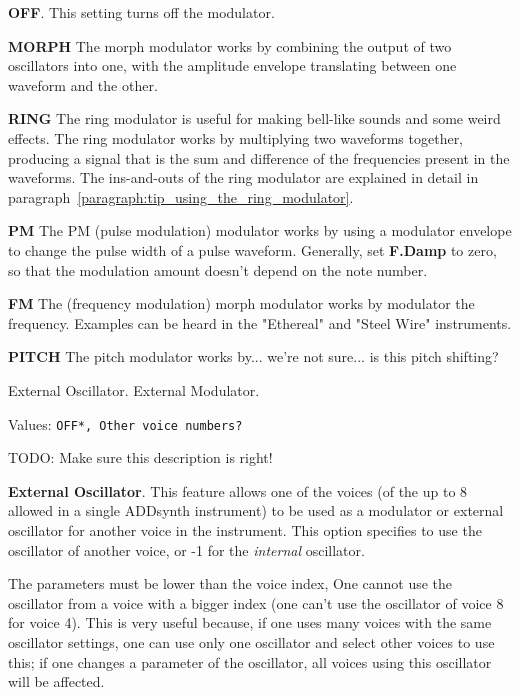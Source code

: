    \begin{enumber}
      \item \textbf{OFF}.
      This setting turns off the modulator.
      \item \textbf{MORPH}
      The morph modulator works by combining the output of two oscillators
      into one, with the amplitude envelope translating between one waveform
      and the other.
      \item \textbf{RING}
      The ring modulator is useful for making bell-like sounds and some weird
      effects.  The ring modulator works by multiplying two waveforms
      together, producing a signal that is the sum and difference of the
      frequencies present in the waveforms.  The ins-and-outs of the ring
      modulator are explained in detail in
      paragraph~\ref{paragraph:tip_using_the_ring_modulator}.
      \item \textbf{PM}
      The PM (pulse modulation) modulator works by using a modulator
      envelope to change the pulse width of a pulse waveform.
      Generally, set \textbf{F.Damp} to zero, so that the modulation amount
      doesn't depend on the note number.
      \item \textbf{FM}
      The (frequency modulation) morph modulator works by modulator the
      frequency.  Examples can be heard in the "Ethereal" and "Steel Wire"
      instruments.
      \item \textbf{PITCH}
      The pitch modulator works by...
      we're not sure... is this pitch shifting?
   \end{enumber}

   External Oscillator.
   External Modulator.

   Values: \texttt{OFF*, Other voice numbers?}

   TODO: Make sure this description is right!

   \textbf{External Oscillator}.
   This feature allows one of the voices (of the up to 8 allowed in a single
   ADDsynth instrument) to be used as a modulator or external oscillator for
   another voice in the instrument.
   This option specifies to use the oscillator of another voice, or
   -1 for the \textsl{internal} oscillator.

   The parameters must be lower than the voice index, One cannot use the
   oscillator from a voice with a bigger index (one can't use the oscillator
   of voice 8 for voice 4). This is very useful because, if one uses
   many voices with the same oscillator settings, one can use only one
   oscillator and select other voices to use this; if one changes a parameter
   of the oscillator, all voices using this oscillator will be affected.


